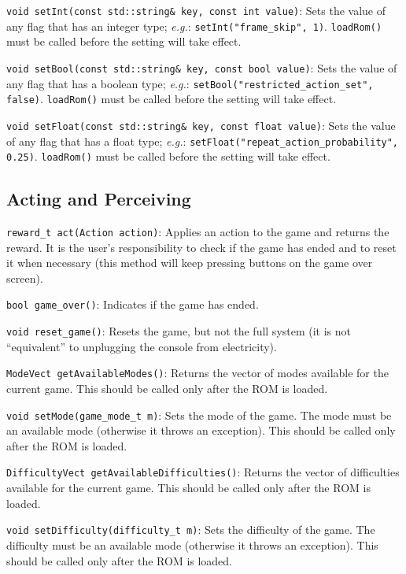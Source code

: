\documentclass[12pt]{article}
\begin{document}
  \verb+void setInt(const std::string& key, const int value)+: Sets the value of any flag
  that has an integer type; \emph{e.g.}: \verb+setInt("frame_skip", 1)+. \verb+loadRom()+
  must be called before the setting will take effect.
  
  \verb+void setBool(const std::string& key, const bool value)+: Sets the value of any flag
  that has a boolean type; \emph{e.g.}: \verb+setBool("restricted_action_set", false)+.
  \verb+loadRom()+ must be called before the setting will take effect.
  
  \verb+void setFloat(const std::string& key, const float value)+: Sets the value of any flag
  that has a float type; \emph{e.g.}: \verb+setFloat("repeat_action_probability", 0.25)+.
  \verb+loadRom()+ must be called before the setting will take effect.
  
  \subsection{Acting and Perceiving}\label{subsec:acting_perceiving}
  
  \indent \indent \verb+reward_t act(Action action)+: Applies an action to the game and returns the
  reward. It is the user's responsibility to check if the game has ended and to reset it when
  necessary (this method will keep pressing buttons on the game over screen).
  
  \verb+bool game_over()+: Indicates if the game has ended.
  
  \verb+void reset_game()+: Resets the game, but not the full system (it is not ``equivalent''
  to unplugging the console from electricity).

  \verb+ModeVect getAvailableModes()+: Returns the vector of modes available for the current
  game. This should be called only after the ROM is loaded.

  \verb+void setMode(game_mode_t m)+: Sets the mode of the game. The mode must be an available
  mode (otherwise it throws an exception). This should be called only after the ROM is loaded.

  \verb+DifficultyVect getAvailableDifficulties()+: Returns the vector of difficulties available
  for the current game. This should be called only after the ROM is loaded.

  \verb+void setDifficulty(difficulty_t m)+: Sets the difficulty of the game. The difficulty must
  be an available mode (otherwise it throws an exception). This should be called only after the
  ROM is loaded.
 
\end{document}
